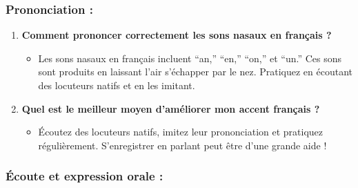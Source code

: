 \documentclass[
  16pt,
  letterpaper,
  DIV=11,
  numbers=noendperiod]{scrartcl}
\providecommand{\tightlist}{%
  \setlength{\itemsep}{0pt}\setlength{\parskip}{0pt}}\usepackage{longtable,booktabs,array}
\begin{document}
\subsubsection{Prononciation :}\label{prononciation}

\begin{enumerate}
\def\labelenumi{\arabic{enumi}.}
\setcounter{enumi}{3}
\tightlist
\item
  \textbf{Comment prononcer correctement les sons nasaux en français ?}

  \begin{itemize}
  \tightlist
  \item
    Les sons nasaux en français incluent ``an,'' ``en,'' ``on,'' et
    ``un.'' Ces sons sont produits en laissant l'air s'échapper par le
    nez. Pratiquez en écoutant des locuteurs natifs et en les imitant.
  \end{itemize}
\item
  \textbf{Quel est le meilleur moyen d'améliorer mon accent français ?}

  \begin{itemize}
  \tightlist
  \item
    Écoutez des locuteurs natifs, imitez leur prononciation et pratiquez
    régulièrement. S'enregistrer en parlant peut être d'une grande aide
    !
  \end{itemize}
\end{enumerate}

\subsubsection{Écoute et expression orale
:}\label{uxe9coute-et-expression-orale}
\end{document}
